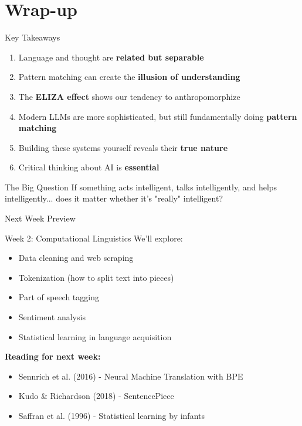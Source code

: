 \documentclass[aspectratio=169]{beamer}
\begin{document}
\section{Wrap-up}

\begin{frame}[shrink=10]{Key Takeaways 🔑}
\begin{enumerate}\setlength{\itemsep}{0pt}
    \item Language and thought are \textbf{related but separable}
    \item Pattern matching can create the \textbf{illusion of understanding}
    \item The \textbf{ELIZA effect} shows our tendency to anthropomorphize
    \item Modern LLMs are more sophisticated, but still fundamentally doing \textbf{pattern matching}
    \item Building these systems yourself reveals their \textbf{true nature}
    \item Critical thinking about AI is \textbf{essential}
\end{enumerate}

\vspace{0.3cm}

\begin{alertblock}{The Big Question}
If something acts intelligent, talks intelligently, and helps intelligently... does it matter whether it's "really" intelligent?
\end{alertblock}
\end{frame}

\begin{frame}[shrink=10]{Next Week Preview 🔮}
\small
\begin{block}{Week 2: Computational Linguistics}
We'll explore:
\begin{itemize}\setlength{\itemsep}{0pt}
    \item Data cleaning and web scraping
    \item Tokenization (how to split text into pieces)
    \item Part of speech tagging
    \item Sentiment analysis
    \item Statistical learning in language acquisition
\end{itemize}
\end{block}

\vspace{0.3cm}

\textbf{Reading for next week:}
\begin{itemize}\setlength{\itemsep}{0pt}
    \item Sennrich et al. (2016) - Neural Machine Translation with BPE
    \item Kudo \& Richardson (2018) - SentencePiece
    \item Saffran et al. (1996) - Statistical learning by infants
\end{itemize}
\end{frame}
\end{document}
